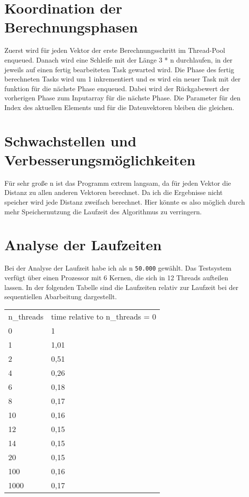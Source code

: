 \documentclass[12pt,a4paper]{article}
\begin{document}

\section{Koordination der Berechnungsphasen}

Zuerst wird für jeden Vektor der erste Berechnungsschritt im Thread-Pool enqueued.
Danach wird eine Schleife mit der Länge 3 * n durchlaufen, in der jeweils auf einen fertig bearbeiteten Task gewarted wird.
Die Phase des fertig berechneten Tasks wird um 1 inkrementiert und es wird ein neuer Task mit der funktion für die nächste Phase enqueued.
Dabei wird der Rückgabewert der vorherigen Phase zum Inputarray für die nächste Phase.
Die Parameter für den Index des aktuellen Elements und für die Datenvektoren bleiben die gleichen.


\section{Schwachstellen und Verbesserungsmöglichkeiten}

Für sehr große n ist das Programm extrem langsam, da für jeden Vektor die Distanz zu allen anderen Vektoren berechnet.
Da ich die Ergebnisse nicht speicher wird jede Distanz zweifach berechnet.
Hier könnte es also möglich durch mehr Speichernutzung die Laufzeit des Algorithmus zu verringern.

\newpage

\section{Analyse der Laufzeiten}

Bei der Analyse der Laufzeit habe ich als n \texttt{50.000} gewählt.
Das Testsystem verfügt über einen Prozessor mit 6 Kernen, die sich in 12 Threads aufteilen lassen.
In der folgenden Tabelle sind die Laufzeiten relativ zur Laufzeit bei der sequentiellen Abarbeitung dargestellt.

\begin{table}[h]
\begin{tabular}{ll}
n\_threads & time relative to n\_threads = 0\\
0          & 1\\
1          & 1,01\\
2          & 0,51\\
4          & 0,26\\
6          & 0,18\\
8          & 0,17\\
10         & 0,16\\
12         & 0,15\\
14         & 0,15\\
20         & 0,15\\
100        & 0,16\\
1000       & 0,17
\end{tabular}
\end{table}
\end{document}
